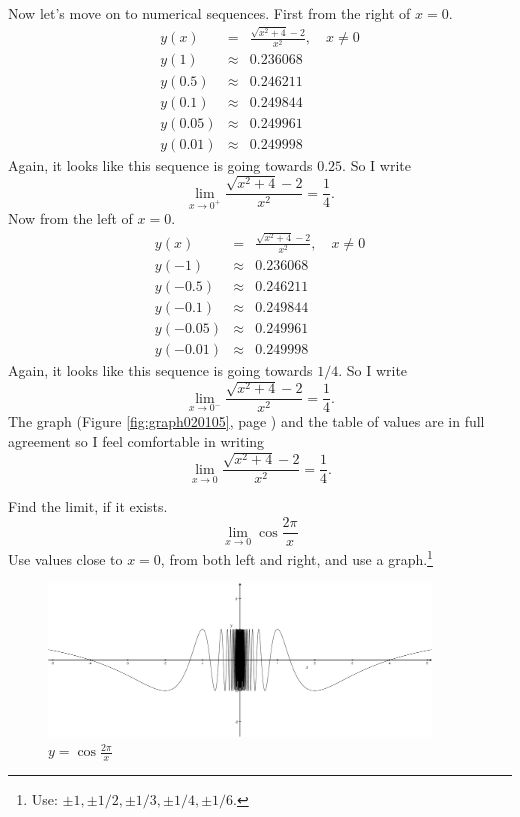 \documentclass[12pt,addpoints, answers, fleqn]{exam}
\begin{document}
\begin{questions}
\begin{solution}
Now let's move on to numerical sequences. First from the right of $x=0$.
\begin{eqnarray*}
y\left( x \right) &=& \frac{\sqrt{x^2+4} -2}{x^2}, \quad x \neq 0\\
y\left( 1 \right) &\approx& 0.236068\\
y\left( 0.5 \right) &\approx& 0.246211\\
y\left( 0.1 \right) &\approx& 0.249844\\
y\left( 0.05 \right) &\approx&0.249961 \\
y\left( 0.01\right) &\approx&0.249998
\end{eqnarray*}
Again, it looks like this sequence is going towards $0.25$. So I write
\[
\mathop {\lim }\limits_{x \to 0^+ }  \frac{\sqrt{x^2+4} -2}{x^2} = \frac{1}{4}.
\]
Now from the left of $x=0$.
\begin{eqnarray*}
y\left( x \right) &=& \frac{\sqrt{x^2+4} -2}{x^2}, \quad x \neq 0\\
y\left( -1 \right) &\approx& 0.236068\\
y\left( -0.5 \right) &\approx& 0.246211\\
y\left( -0. 1\right) &\approx& 0.249844\\
y\left( -0.05 \right) &\approx&0.249961 \\
y\left( -0.01 \right) &\approx&0.249998
\end{eqnarray*}
Again, it looks like this sequence is going towards $1/4$. So I write
\[
\mathop {\lim }\limits_{x \to 0^- }  \frac{\sqrt{x^2+4} -2}{x^2} = \frac{1}{4}.
\]
The graph (Figure \ref{fig:graph020105}, page \pageref{fig:graph020105})  and the table of values are in full agreement so I feel comfortable in writing
\[
\mathop {\lim }\limits_{x \to 0 }  \frac{\sqrt{x^2+4} -2}{x^2} = \frac{1}{4}.
\]
\end{solution}

\question Find the limit, if it exists.
\[
\mathop {\lim }\limits_{x \to 0 }  \cos \frac{2 \pi}{x}
\]
Use values close to $x=0$, from both left and right, and use a graph.\footnote{Use: $\pm 1,\pm 1/2,\pm 1/3,\pm 1/4,\pm 1/6$.}

\begin{figure}[htbp] %
   \centering
   \includegraphics[width=4in]{./graphics/graph020106.pdf} 
   \caption{$\displaystyle y = \cos \frac{2 \pi}{x}$}
   \label{fig:graph020106}
\end{figure}


\end{questions}
\end{document}
